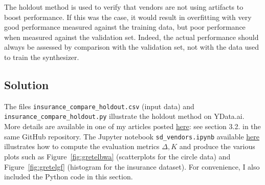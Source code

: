 \documentclass[oneside,10pt]{book}
\begin{document}
\noindent The holdout method is used to verify that vendors are not using artifacts to boost performance. If this was the case,
 it would result in overfitting with very good performance measured against the training data, but poor performance when measured against the  validation set. Indeed, the actual performance should always be assessed by comparison with the validation set, not with the data used to train the synthesizer.


\subsection{Solution}

The files \texttt{insurance\_compare\_holdout.csv} (input data)
 and \texttt{insurance\_compare\_holdout.py} illustrate the holdout method on YData.ai. More details are
 available in one of my articles posted \href{https://github.com/VincentGranville/Main/blob/main/vendors.pdf}{here}: see section 3.2. 
  in the same GitHub repository. The Jupyter notebook  \texttt{sd\_vendors.ipynb} available 
 \href{https://github.com/VincentGranville/Notebooks/blob/main/sd_vendors.ipynb}{here} illustrates how to  compute the evaluation
 metrics $\Delta, K$ and 
 produce the various plots such as Figure~\ref{fig:gretelbwa}  (scatterplots for the circle data) and 
Figure~\ref{fig:gretelgf} (histogram for the insurance dataset).  For convenience, I also included the Python code in this section. \vspace{1ex}
\end{document}
